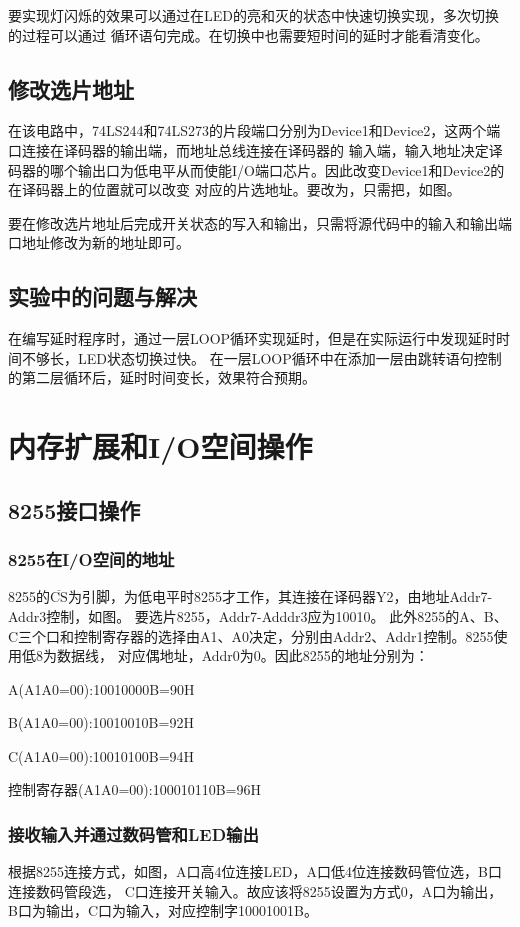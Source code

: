 \documentclass[12pt, a4paper, oneside]{ctexart}
\begin{document}
    要实现灯闪烁的效果可以通过在LED的亮和灭的状态中快速切换实现，多次切换的过程可以通过
    循环语句完成。在切换中也需要短时间的延时才能看清变化。
    \subsection{修改选片地址}
    在该电路中，74LS244和74LS273的片段端口分别为Device1和Device2，这两个端口连接在译码器的输出端，而地址总线连接在译码器的
    输入端，输入地址决定译码器的哪个输出口为低电平从而使能I/O端口芯片。因此改变Device1和Device2的在译码器上的位置就可以改变
    对应的片选地址。要改为，只需把，如图。

    要在修改选片地址后完成开关状态的写入和输出，只需将源代码中的输入和输出端口地址修改为新的地址即可。

    \subsection{实验中的问题与解决}
    在编写延时程序时，通过一层LOOP循环实现延时，但是在实际运行中发现延时时间不够长，LED状态切换过快。
    在一层LOOP循环中在添加一层由跳转语句控制的第二层循环后，延时时间变长，效果符合预期。
    \section{内存扩展和I/O空间操作}
    \subsection{8255接口操作}
    \subsubsection{8255在I/O空间的地址}
    8255的$\overline{\text{CS}}$为引脚，为低电平时8255才工作，其连接在译码器Y2，由地址Addr7-Addr3控制，如图。
    要选片8255，Addr7-Adddr3应为10010。
    此外8255的A、B、C三个口和控制寄存器的选择由A1、A0决定，分别由Addr2、Addr1控制。8255使用低8为数据线，
    对应偶地址，Addr0为0。因此8255的地址分别为：

    A(A1A0=00):10010000B=90H

    B(A1A0=00):10010010B=92H

    C(A1A0=00):10010100B=94H

    控制寄存器(A1A0=00):100010110B=96H
    \subsubsection{接收输入并通过数码管和LED输出}
    根据8255连接方式，如图，A口高4位连接LED，A口低4位连接数码管位选，B口连接数码管段选，
    C口连接开关输入。故应该将8255设置为方式0，A口为输出，B口为输出，C口为输入，对应控制字10001001B。
\end{document}
